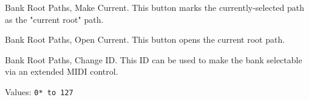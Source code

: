    Bank Root Paths, Make Current.
   This button marks the currently-selected path as the "current root" path.

   Bank Root Paths, Open Current.
   This button opens the current root path.

   Bank Root Paths, Change ID.
   This ID can be used to make the bank selectable via an extended MIDI
   control.

   Values: \texttt{0* to 127}


